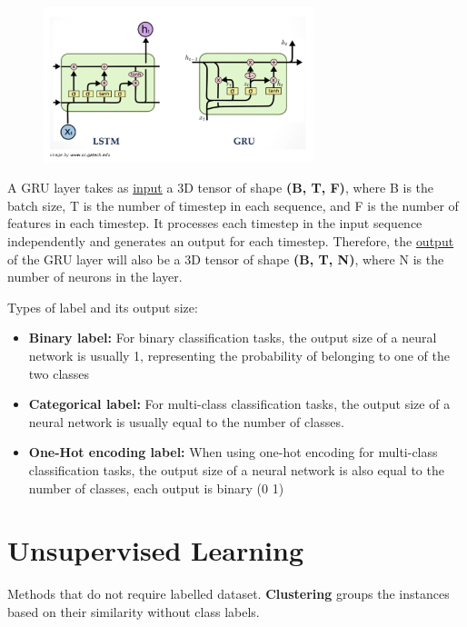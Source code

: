 \documentclass[a4paper,10pt]{article}
\begin{document}
\vspace*{-0.3cm}
\begin{figure}[ht]
    \centering
    \includegraphics[width =0.7\textwidth]{LSTM_GRU.png}
\end{figure}

\par
A GRU layer takes as \underline{input} a 3D tensor of shape \textbf{(B, T, F)}, where B is the batch size, T is the number of timestep in each sequence, and F is the number of features in each timestep. It processes each timestep in the input sequence independently and generates an output for each timestep. Therefore, the \underline{output} of the GRU layer will also be a 3D tensor of shape \textbf{(B, T, N)}, where N is the number of neurons in the layer.\par 

Types of label and its output size:
\begin{itemize}
    \item \textbf{Binary label:} For binary classification tasks, the output size of a neural network is usually 1, representing the probability of belonging to one of the two classes
    \item \textbf{Categorical label:} For multi-class classification tasks, the output size of a neural network is usually equal to the number of classes.
    \item \textbf{One-Hot encoding label:} When using one-hot encoding for multi-class classification tasks, the output size of a neural network is also equal to the number of classes, each output is binary (0 1)
\end{itemize}

\section{Unsupervised Learning}
Methods that do not require labelled dataset. \textbf{Clustering} groups the instances based on their similarity without class labels.
\end{document}
